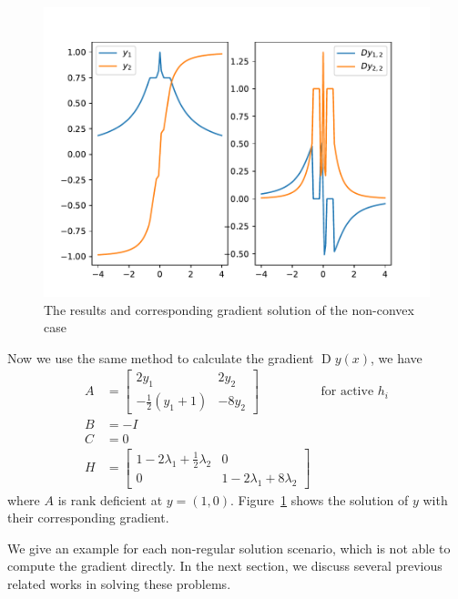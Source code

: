 \begin{figure}[t]
    \label{fig:non-convex-gradient}
    \centering
    \includegraphics[page=1, width=.8\textwidth]{figs/gradient-non-convex.pdf}
    \caption{The results and corresponding gradient solution of the non-convex case~\citep{SG:19}}
\end{figure}
\par Now we use the same method to calculate the gradient $\operatorname{D}y(x)$, we have
$$
\begin{array}{lll}
    A &= \begin{bmatrix}
         2y_1 & 2 y_2 \\ -\frac{1}{2} (y_1 + 1) & -8 y_2
         \end{bmatrix} & \text{for active $h_i$} \\
    B &= -I \\
    C &= 0 \\
    H &= \begin{bmatrix}
         1 - 2 \lambda_1 + \frac{1}{2} \lambda_2 & 0 \\
         0 & 1 - 2 \lambda_1 + 8 \lambda_2
         \end{bmatrix}
\end{array}
$$
where $A$ is rank deficient at $y = (1, 0)$. Figure~\ref{fig:non-convex-gradient} shows the solution of $y$ with their corresponding gradient. 
\par We give an example for each non-regular solution scenario, which is not able to compute the gradient directly. In the next section, we discuss several previous related works in solving these problems. 

